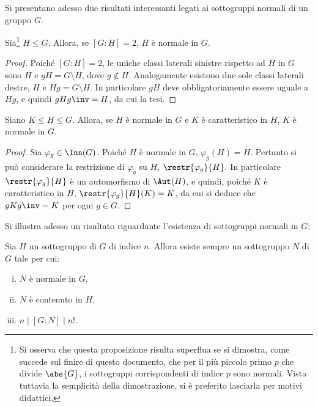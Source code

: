\documentclass[12pt]{scrartcl}
\begin{document}
	
	Si presentano adesso due risultati interessanti legati ai sottogruppi normali di
	un gruppo $G$.
	
	\begin{proposition}
		Sia\footnote{
			Si osserva che questa proposizione risulta superflua se si dimostra,
			come succede sul finire di questo documento, che per il più piccolo
			primo $p$ che divide $\abs{G}$, i sottogruppi corrispondenti di
			indice $p$ sono normali. Vista tuttavia la semplicità della dimostrazione,
			si è preferito lasciarla per motivi didattici.
		} $H \leq G$. Allora, se $[G : H] = 2$, $H$ è normale in $G$.
	\end{proposition}
	
	\begin{proof}
		Poiché $[G : H] = 2$, le uniche classi laterali sinistre rispetto ad $H$ in
		$G$ sono $H$ e $gH = G \setminus H$, dove $g \notin H$. Analogamente esistono
		due sole classi laterali destre, $H$ e $Hg = G \setminus H$. In particolare
		$gH$ deve obbligatoriamente essere uguale a $Hg$, e quindi $gHg\inv = H$, da
		cui la tesi.
	\end{proof}
	
	\begin{proposition}
		Siano $K \leq H \leq G$. Allora, se $H$ è normale in $G$ e $K$ è caratteristico
		in $H$, $K$ è normale in $G$.
	\end{proposition}
	
	\begin{proof}
		Sia $\varphi_g \in \Inn(G)$. Poiché $H$ è normale in $G$, $\varphi_g(H) = H$. Pertanto
		si può considerare la restrizione di $\varphi_g$ su $H$, $\restr{\varphi_g}{H}$.
		In particolare $\restr{\varphi_g}{H}$ è un automorfismo di $\Aut(H)$, e quindi,
		poiché $K$ è caratteristico in $H$, $\restr{\varphi_g}{H}(K) = K$, da cui si
		deduce che $gKg\inv = K$ per ogni $g \in G$.
	\end{proof}
	
	Si illustra adesso un risultato riguardante l'esistenza di sottogruppi normali in $G$:
	\begin{theorem}[di Poincaré]
		Sia $H$ un sottogruppo di $G$ di indice $n$. Allora esiste sempre un sottogruppo
		$N$ di $G$ tale per cui:
		\begin{enumerate}[(i)]
			\item $N$ è normale in $G$,
			\item $N$ è contenuto in $H$,
			\item $n \mid [G : N] \mid n!$.
		\end{enumerate}
	\end{theorem}
	
\end{document}
